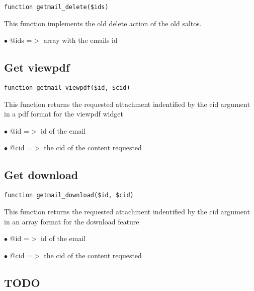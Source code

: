 \documentclass[a4paper]{book}
\begin{document}
\begin{lstlisting}
function getmail_delete($ids)
\end{lstlisting}

This function implements the old delete action of the old saltos.

\begin{compactitem}
\item[\color{myblue}$\bullet$] @ids =$>$ array with the emails id
\end{compactitem}

\hypertarget{toc62}{}
\subsection{Get viewpdf}

\begin{lstlisting}
function getmail_viewpdf($id, $cid)
\end{lstlisting}

This function returns the requested attachment indentified by the cid argument
in a pdf format for the viewpdf widget

\begin{compactitem}
\item[\color{myblue}$\bullet$] @id  =$>$ id of the email
\item[\color{myblue}$\bullet$] @cid =$>$ the cid of the content requested
\end{compactitem}

\hypertarget{toc63}{}
\subsection{Get download}

\begin{lstlisting}
function getmail_download($id, $cid)
\end{lstlisting}

This function returns the requested attachment indentified by the cid argument
in an array format for the download feature

\begin{compactitem}
\item[\color{myblue}$\bullet$] @id  =$>$ id of the email
\item[\color{myblue}$\bullet$] @cid =$>$ the cid of the content requested
\end{compactitem}

\hypertarget{toc64}{}
\subsection{TODO}
\end{document}
